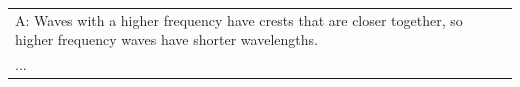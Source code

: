 \begin{table}[ht]
\begin{tabular}{p{13cm}}
A: Waves with a higher frequency have crests that are closer together, so higher frequency waves have shorter wavelengths. \\
... \\
\bottomrule
\end{tabular}
\label{tab:psychology_example}
\end{table}